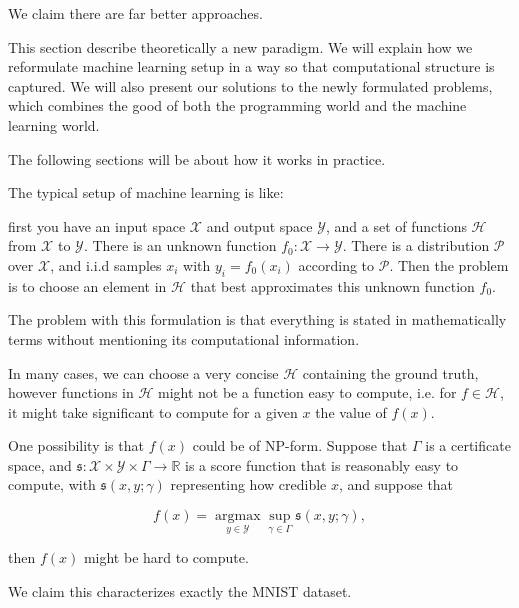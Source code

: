 \documentclass[11pt]{article} 	%
\theoremstyle{definition}
\begin{document}
We claim there are far better approaches.

This section describe theoretically a new paradigm.
We will explain how we reformulate machine learning setup in a way so that computational structure is captured.
We will also present our solutions to the newly formulated problems, which combines the good of both the programming world and the machine learning world.

The following sections will be about how it works in practice.


The typical setup of machine learning is like:

first you have an input space $\mathcal{X}$ and output space $\mathcal{Y}$, and a set of functions $\mathcal{H}$ from $\mathcal{X}$ to $\mathcal{Y}$.
There is an unknown function $f_0:\mathcal{X}\to \mathcal{Y}$.
There is a distribution $\mathcal{P}$ over $\mathcal{X}$, and i.i.d samples $x_i$ with $y_i=f_0(x_i)$ according to $\mathcal{P}$.
Then the problem is to choose an element in  $\mathcal{H}$ that best approximates this unknown function  $f_0$.

The problem with this formulation is that everything is stated in mathematically terms without mentioning its computational information.

 In many cases, we can choose a very concise $\mathcal{H}$ containing the ground truth, however functions in $\mathcal{H}$ might not be a function easy to compute, i.e. for $f\in \mathcal{H}$,
 it might take significant to compute for a given $x$ the value of $f(x)$.

 One possibility is that $f(x)$ could be of NP-form. Suppose that $\Gamma$ is a certificate space, and $\mathfrak{s}: \mathcal{X}\times \mathcal{Y}\times \Gamma\to \mathbb{R}$ is a score function that is reasonably easy to compute, with $\mathfrak{s}(x,y;\gamma)$ representing how credible $x$, and suppose that

 \begin{equation}
 	f(x)=\mathop{\text{argmax}}\limits_{y\in \mathcal{Y}}\sup_{\gamma\in \Gamma}\mathfrak{s}(x, y; \gamma),
 \end{equation}

 then $f(x)$ might be hard to compute.

 We claim this characterizes exactly the MNIST dataset.
\end{document}
